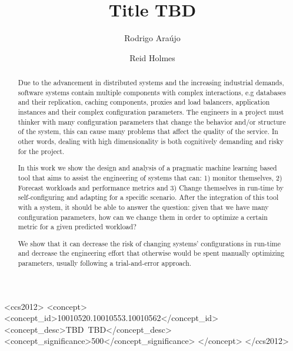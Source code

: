 \documentclass[sigconf]{acmart}
\begin{document}
\title{Title TBD}


\author{Rodrigo Araújo}

\author{Reid Holmes}

\renewcommand{\shortauthors}{B. Trovato et al.}


\begin{abstract}
Due to the advancement in distributed systems and the increasing industrial demands, software systems contain multiple components with complex interactions, e.g databases and their replication, caching components, proxies and load balancers, application instances and their complex configuration parameters. The engineers in a project must thinker with many configuration parameters that change the behavior and/or structure of the system, this can cause many problems that affect the quality of the service. In other words, dealing with high dimensionality is both cognitively demanding and risky for the project.

In this work we show the design and analysis of a pragmatic machine learning based tool that aims to assist the engineering of systems that can: 1) monitor themselves, 2) Forecast workloads and performance metrics and 3) Change themselves in run-time by self-configuring and adapting for a specific scenario. After the integration of this tool with a system, it should be able to answer the question: given that we have many configuration parameters, how can we change them in order to optimize a certain metric for a given predicted workload?

We show that it can decrease the risk of changing systems' configurations in run-time and decrease the engineering effort that otherwise would be spent manually optimizing parameters, usually following a trial-and-error approach.

\end{abstract}

%
%
\begin{CCSXML}
<ccs2012>
 <concept>
  <concept_id>10010520.10010553.10010562</concept_id>
  <concept_desc>TBD~TBD</concept_desc>
  <concept_significance>500</concept_significance>
 </concept>
</ccs2012>  
\end{CCSXML}





\maketitle




 
\end{document}
